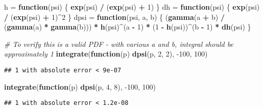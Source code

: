 \documentclass[]{article}
\newenvironment{Shaded}{\begin{snugshade}}{\end{snugshade}}
\newcommand{\CommentTok}[1]{\textcolor[rgb]{0.56,0.35,0.01}{\textit{#1}}}
\newcommand{\ControlFlowTok}[1]{\textcolor[rgb]{0.13,0.29,0.53}{\textbf{#1}}}
\newcommand{\DecValTok}[1]{\textcolor[rgb]{0.00,0.00,0.81}{#1}}
\newcommand{\KeywordTok}[1]{\textcolor[rgb]{0.13,0.29,0.53}{\textbf{#1}}}
\newcommand{\NormalTok}[1]{#1}
\newcommand{\OperatorTok}[1]{\textcolor[rgb]{0.81,0.36,0.00}{\textbf{#1}}}
\newcommand{\StringTok}[1]{\textcolor[rgb]{0.31,0.60,0.02}{#1}}
\begin{document}
\begin{Shaded}
\begin{Highlighting}[]
\NormalTok{h =}\StringTok{ }\ControlFlowTok{function}\NormalTok{(psi) \{}
  \KeywordTok{exp}\NormalTok{(psi) }\OperatorTok{/}\StringTok{ }\NormalTok{(}\KeywordTok{exp}\NormalTok{(psi) }\OperatorTok{+}\StringTok{ }\DecValTok{1}\NormalTok{)}
\NormalTok{\}}
\NormalTok{dh =}\StringTok{ }\ControlFlowTok{function}\NormalTok{(psi) \{}
  \KeywordTok{exp}\NormalTok{(psi) }\OperatorTok{/}\StringTok{ }\NormalTok{(}\KeywordTok{exp}\NormalTok{(psi) }\OperatorTok{+}\StringTok{ }\DecValTok{1}\NormalTok{)}\OperatorTok{^}\DecValTok{2}
\NormalTok{\}}
\NormalTok{dpsi =}\StringTok{ }\ControlFlowTok{function}\NormalTok{(psi, a, b) \{}
\NormalTok{  (}\KeywordTok{gamma}\NormalTok{(a }\OperatorTok{+}\StringTok{ }\NormalTok{b) }\OperatorTok{/}\StringTok{ }\NormalTok{(}\KeywordTok{gamma}\NormalTok{(a) }\OperatorTok{*}\StringTok{ }\KeywordTok{gamma}\NormalTok{(b))) }\OperatorTok{*}\StringTok{ }\KeywordTok{h}\NormalTok{(psi)}\OperatorTok{^}\NormalTok{(a }\OperatorTok{-}\StringTok{ }\DecValTok{1}\NormalTok{) }\OperatorTok{*}\StringTok{ }\NormalTok{(}\DecValTok{1} \OperatorTok{-}\StringTok{ }\KeywordTok{h}\NormalTok{(psi))}\OperatorTok{^}\NormalTok{(b }\OperatorTok{-}\StringTok{ }\DecValTok{1}\NormalTok{) }\OperatorTok{*}\StringTok{ }\KeywordTok{dh}\NormalTok{(psi)}
\NormalTok{\}}

\CommentTok{# To verify this is a valid PDF - with various a and b, integral should be approximately 1}
\KeywordTok{integrate}\NormalTok{(}\ControlFlowTok{function}\NormalTok{(p) }\KeywordTok{dpsi}\NormalTok{(p, }\DecValTok{2}\NormalTok{, }\DecValTok{2}\NormalTok{), }\DecValTok{-100}\NormalTok{, }\DecValTok{100}\NormalTok{)}
\end{Highlighting}
\end{Shaded}

\begin{verbatim}
## 1 with absolute error < 9e-07
\end{verbatim}

\begin{Shaded}
\begin{Highlighting}[]
\KeywordTok{integrate}\NormalTok{(}\ControlFlowTok{function}\NormalTok{(p) }\KeywordTok{dpsi}\NormalTok{(p, }\DecValTok{4}\NormalTok{, }\DecValTok{8}\NormalTok{), }\DecValTok{-100}\NormalTok{, }\DecValTok{100}\NormalTok{)}
\end{Highlighting}
\end{Shaded}

\begin{verbatim}
## 1 with absolute error < 1.2e-08
\end{verbatim}
\end{document}
